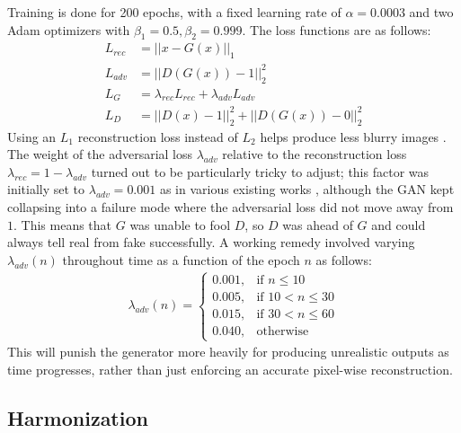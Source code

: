 \documentclass[twocolumn,showpacs,%
  nofootinbib,aps,superscriptaddress,%
  eqsecnum,prd,notitlepage,showkeys,10pt]{revtex4-1}
\begin{document}
\hspace{\parindent} Training is done for 200 epochs, with a fixed learning rate of $\alpha=0.0003$ and two Adam optimizers with $\beta_1=0.5, \beta_2=0.999$. The loss functions are as follows:
\begin{align}
  L_{rec} &= ||x-G(x)||_1 \\
  L_{adv} &= ||D(G(x))-1||_2^2 \\
  L_G &= \lambda_{rec}L_{rec} + \lambda_{adv}L_{adv} \\
  L_D &= ||D(x)-1||_2^2 + ||D(G(x))-0||_2^2
\end{align}
Using an $L_1$ reconstruction loss instead of $L_2$ helps produce less blurry images \cite{Huang2018}. The weight of the adversarial loss $\lambda_{adv}$ relative to the reconstruction loss $\lambda_{rec}=1-\lambda_{adv}$ turned out to be particularly tricky to adjust; this factor was initially set to $\lambda_{adv}=0.001$ as in various existing works \cite{Pathak2016, Li2018, Sabini2018}, although the GAN kept collapsing into a failure mode where the adversarial loss did not move away from $1$. This means that $G$ was unable to fool $D$, so $D$ was ahead of $G$ and could always tell real from fake successfully. A working remedy involved varying $\lambda_{adv}(n)$ throughout time as a function of the epoch $n$ as follows:
\begin{align}
  \lambda_{adv}(n) = \begin{cases}
    0.001, & \text{if }n\leq10 \\
    0.005, & \text{if }10<n\leq30 \\
    0.015, & \text{if }30<n\leq60 \\
    0.040, & \text{otherwise}
  \end{cases}
  \label{eq:loss_adv}
\end{align}
This will punish the generator more heavily for producing unrealistic outputs as time progresses, rather than just enforcing an accurate pixel-wise reconstruction.

\subsection{Harmonization}
\end{document}
